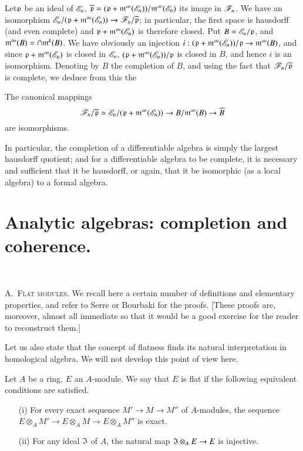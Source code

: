 Let\pageoriginale $\mathfrak{p}$ be an ideal of $\mathscr{E}_{n}$, $\widetilde{\mathfrak{p}}=(\mathfrak{p}+\mathfrak{m}^{\infty}(\mathscr{E}_{n}))/\mathfrak{m}^{\infty}(\mathscr{E}_{n})$ its image in $\mathscr{F}_{n}$. We have an isomorphism $\mathscr{E}_{n}/(\mathfrak{p}+\mathfrak{m}^{\infty}(\mathscr{E}_{n}))\to \mathscr{F}_{n}/\widetilde{\mathfrak{p}}$; in particular, the first space is hausdorff (and even complete) and $\mathfrak{p}+\mathfrak{m}^{\infty}(\mathscr{E}_{n})$ is therefore closed. Put $B=\mathscr{E}_{n}/\mathfrak{p}$, and $\mathfrak{m}^{\infty}(B)=\cap \mathfrak{m}^{k}(B)$. We have obviously an injection $i:(\mathfrak{p}+\mathfrak{m}^{\infty}(\mathscr{E}_{n}))/\mathfrak{p}\to \mathfrak{m}^{\infty}(B)$, and since $\mathfrak{p}+\mathfrak{m}^{\infty}(\mathscr{E}_{n})$ is closed in $\mathscr{E}_{n}$, $(\mathfrak{p}+\mathfrak{m}^{\infty}(\mathscr{E}_{n}))/\mathfrak{p}$ is closed in $B$, and hence $i$ is an isomorphism. Denoting by $\widehat{B}$ the completion of $B$, and using the fact that $\mathscr{F}_{n}/\widetilde{\mathfrak{p}}$ is complete, we deduce from this the

\begin{proposition}\label{chap3-prop3.17}
The canonical mappings
$$
\mathscr{F}_{n}/\widetilde{\mathfrak{p}}\simeq \mathscr{E}_{n}/(\mathfrak{p}+\mathfrak{m}^{\infty}(\mathscr{E}_{n}))\to B/\mathfrak{m}^{\infty}(B)\to \widehat{B}
$$
are isomorphisms.
\end{proposition}

In particular, the completion of a differentiable algebra is simply the largest hausdorff quotient; and for a differentiable algebra to be complete, it is necessary and sufficient that it be hausdorff, or again, that it be isomorphic (as a local algebra) to a formal algebra.

\section[Analytic algebras: completion and coherence]{Analytic algebras: completion and coherence.}\label{chap3-sec4}

~

A.~\textsc{Flat modules.} We recall here a certain number of definitions and elementary properties, and refer to Serre \cite{J. P. Serre : 1} or Bourbaki \cite{N. Bourbaki: 1} for the proofs. [These proofs are, moreover, almost all immediate so that it would be a good exercise for the reader to reconstruct them.]

Let us also state that the concept of flatness finds its natural interpretation in homological algebra. We will not develop this point of view here.

\begin{definition}\label{chap3-defi4.1}
Let $A$ be a ring, $E$ an $A$-module. We say that $E$ is flat if the following equivalent conditions are satisfied.
\begin{itemize}
\item[\rm(i)] For every exact sequence $M'\to M\to M''$ of $A$-modules, the sequence $E\otimes_{A}M'\to E\otimes_{A}M\to E\otimes_{A}M''$ is exact.

\item[\rm(ii)] For any ideal $\mathfrak{I}$ of $A$, the natural map $\mathfrak{I}\otimes_{A}E\to E$ is injective.
\end{itemize}
\end{definition}

